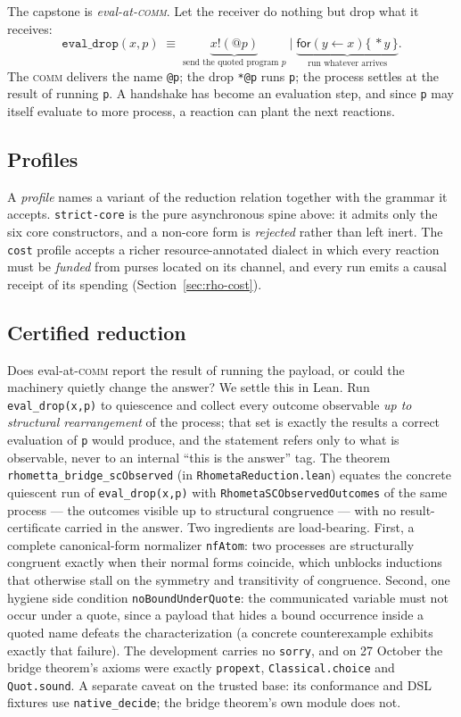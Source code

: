 \documentclass[11pt]{article}
\newcommand{\code}[1]{\texttt{#1}}
\begin{document}
The capstone is \emph{eval-at-\textsc{comm}}. Let the receiver do nothing but drop what it
receives:
\[
  \texttt{eval\_drop}(x,p)\;\equiv\;
  \underbrace{x!(@p)}_{\text{send the quoted program } p}\;\big|\;
  \underbrace{\mathsf{for}(y \leftarrow x)\{\,*y\,\}}_{\text{run whatever arrives}}.
\]
The \textsc{comm} delivers the name \code{@p}; the drop \code{*@p} runs \code{p}; the
process settles at the result of running \code{p}. A handshake has become an evaluation
step, and since \code{p} may itself evaluate to more process, a reaction can plant the next
reactions.

\subsection{Profiles}

A \emph{profile} names a variant of the reduction relation together with the grammar it
accepts. \code{strict-core} is the pure asynchronous spine above: it admits only the six core
constructors, and a non-core form is \emph{rejected} rather than left inert. The \code{cost}
profile accepts a richer resource-annotated dialect in which every reaction must be
\emph{funded} from purses located on its channel, and every run emits a causal receipt of
its spending (Section~\ref{sec:rho-cost}).

\subsection{Certified reduction}
\label{sec:rho-lean}

Does eval-at-\textsc{comm} report the result of running the payload, or could the machinery
quietly change the answer? We settle this in Lean. Run \code{eval\_drop(x,p)} to quiescence
and collect every outcome observable \emph{up to structural rearrangement} of the process;
that set is exactly the results a correct evaluation of \code{p} would produce, and the
statement refers only to what is observable, never to an internal ``this is the answer''
tag. The theorem \code{rhometta\_bridge\_scObserved} (in \code{RhometaReduction.lean})
equates the concrete quiescent run of \code{eval\_drop(x,p)} with
\code{RhometaSCObservedOutcomes} of the same process --- the outcomes visible up to
structural congruence --- with no result-certificate carried in the answer. Two ingredients
are load-bearing. First, a complete canonical-form normalizer \code{nfAtom}: two processes
are structurally congruent exactly when their normal forms coincide, which unblocks
inductions that otherwise stall on the symmetry and transitivity of congruence. Second, one
hygiene side condition \code{noBoundUnderQuote}: the communicated variable must not occur
under a quote, since a payload that hides a bound occurrence inside a quoted name defeats the
characterization (a concrete counterexample exhibits exactly that failure). The development
carries no \code{sorry}, and on 27 October the bridge theorem's axioms were exactly
\code{propext}, \code{Classical.choice} and \code{Quot.sound}. A separate caveat on the trusted
base: its conformance and DSL fixtures use \code{native\_decide}; the bridge theorem's own module
does not.
\end{document}
